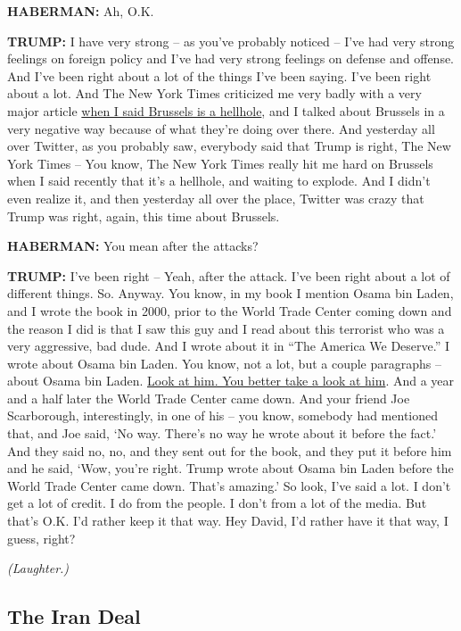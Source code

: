 \textbf{HABERMAN:} Ah, O.K.

\textbf{TRUMP:} I have very strong -- as you've probably noticed -- I've
had very strong feelings on foreign policy and I've had very strong
feelings on defense and offense. And I've been right about a lot of the
things I've been saying. I've been right about a lot. And The New York
Times criticized me very badly with a very major article
\href{http://www.nytimes3xbfgragh.onion/2016/01/28/world/europe/trump-finds-new-city-to-insult-brussels.html}{when
I said Brussels is a hellhole}, and I talked about Brussels in a very
negative way because of what they're doing over there. And yesterday all
over Twitter, as you probably saw, everybody said that Trump is right,
The New York Times -- You know, The New York Times really hit me hard on
Brussels when I said recently that it's a hellhole, and waiting to
explode. And I didn't even realize it, and then yesterday all over the
place, Twitter was crazy that Trump was right, again, this time about
Brussels.

\textbf{HABERMAN:} You mean after the attacks?

\textbf{TRUMP:} I've been right -- Yeah, after the attack. I've been
right about a lot of different things. So. Anyway. You know, in my book
I mention Osama bin Laden, and I wrote the book in 2000, prior to the
World Trade Center coming down and the reason I did is that I saw this
guy and I read about this terrorist who was a very aggressive, bad dude.
And I wrote about it in ``The America We Deserve.'' I wrote about Osama
bin Laden. You know, not a lot, but a couple paragraphs -- about Osama
bin Laden.
\href{http://www.nytimes3xbfgragh.onion/interactive/2016/us/elections/fact-check.html\#/factcheck-15?smid=tw-share}{Look
at him. You better take a look at him}. And a year and a half later the
World Trade Center came down. And your friend Joe Scarborough,
interestingly, in one of his -- you know, somebody had mentioned that,
and Joe said, `No way. There's no way he wrote about it before the
fact.' And they said no, no, and they sent out for the book, and they
put it before him and he said, `Wow, you're right. Trump wrote about
Osama bin Laden before the World Trade Center came down. That's
amazing.' So look, I've said a lot. I don't get a lot of credit. I do
from the people. I don't from a lot of the media. But that's O.K. I'd
rather keep it that way. Hey David, I'd rather have it that way, I
guess, right?

\emph{(Laughter.)}

\hypertarget{the-iran-deal}{%
\subsection{The Iran Deal}\label{the-iran-deal}}

